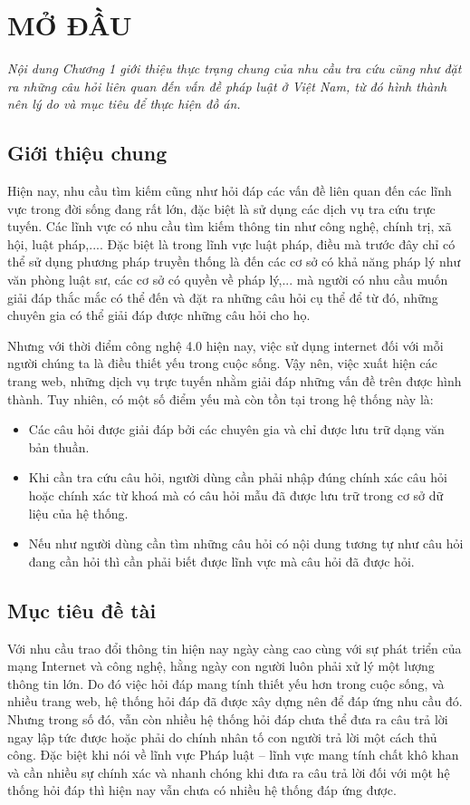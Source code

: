 \chapter{MỞ ĐẦU}
\label{Chapter1}
\textit{Nội dung Chương 1 giới thiệu thực trạng chung của nhu cầu tra cứu cũng như đặt ra những câu hỏi liên quan đến vấn đề pháp luật ở Việt Nam, từ đó hình thành nên lý do và mục tiêu để thực hiện đồ án.}
\section{Giới thiệu chung}
	Hiện nay, nhu cầu tìm kiếm cũng như hỏi đáp các vấn đề liên quan đến các lĩnh vực trong đời sống đang rất lớn, đặc biệt là sử dụng các dịch vụ tra cứu trực tuyến. Các lĩnh vực có nhu cầu tìm kiếm thông tin như công nghệ, chính trị, xã hội, luật pháp,.... Đặc biệt là trong lĩnh vực luật pháp, điều mà trước đây chỉ có thể sử dụng phương pháp truyền thống là đến các cơ sở có khả năng pháp lý như văn phòng luật sư, các cơ sở có quyền về pháp lý,... mà người có nhu cầu muốn giải đáp thắc mắc có thể đến và đặt ra những câu hỏi cụ thể để từ đó, những chuyên gia có thể giải đáp được những câu hỏi cho họ.
	
	Nhưng với thời điểm công nghệ 4.0 hiện nay, việc sử dụng internet đối với mỗi người chúng ta là điều thiết yếu trong cuộc sống. Vậy nên, việc xuất hiện các trang web, những dịch vụ trực tuyến nhằm giải đáp những vấn đề trên được hình thành. Tuy nhiên, có một số điểm yếu mà còn tồn tại trong hệ thống này là:
	\begin{itemize}
		\item Các câu hỏi được giải đáp bởi các chuyên gia và chỉ được lưu trữ dạng văn bản thuần.
		\item Khi cần tra cứu câu hỏi, người dùng cần phải nhập đúng chính xác câu hỏi hoặc chính xác từ khoá mà có câu hỏi mẫu đã được lưu trữ trong cơ sở dữ liệu của hệ thống.
		\item Nếu như người dùng cần tìm những câu hỏi có nội dung tương tự như câu hỏi đang cần hỏi thì cần phải biết được lĩnh vực mà câu hỏi đã được hỏi.
	\end{itemize}


\section{Mục tiêu đề tài}
Với nhu cầu trao đổi thông tin hiện nay ngày càng cao cùng với sự phát triển của mạng Internet và công nghệ, hằng ngày con người luôn phải xử lý một lượng thông tin lớn. Do đó việc hỏi đáp mang tính thiết yếu hơn trong cuộc sống, và nhiều trang web, hệ thống hỏi đáp đã được xây dựng nên để đáp ứng nhu cầu đó. Nhưng trong số đó, vẫn còn nhiều hệ thống hỏi đáp chưa thể đưa ra câu trả lời ngay lập tức được hoặc phải do chính nhân tố con người trả lời một cách thủ công. Đặc biệt khi nói về lĩnh vực Pháp luật – lĩnh vực mang tính chất khô khan và cần nhiều sự chính xác và nhanh chóng khi đưa ra câu trả lời đối với một hệ thống hỏi đáp thì hiện nay vẫn chưa có nhiều hệ thống đáp ứng được.

